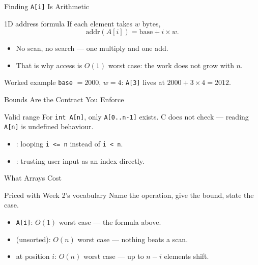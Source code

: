\documentclass[aspectratio=169]{beamer}
\begin{document}
\begin{frame}{Finding \texttt{A[i]} Is Arithmetic}
  \begin{block}{1D address formula}
    If each element takes $w$ bytes,
    \[ \text{addr}(A[i]) = \text{base} + i \times w. \]
  \end{block}
  \begin{itemize}
    \item No scan, no search --- one multiply and one add.
    \item That is why access is $O(1)$ worst case: the work does not grow
      with $n$.
  \end{itemize}
  \begin{exampleblock}{Worked example}
    \texttt{base} $= 2000$, $w = 4$: \texttt{A[3]} lives at
    $2000 + 3 \times 4 = 2012$.
  \end{exampleblock}
\end{frame}

\begin{frame}{Bounds Are the Contract You Enforce}
  \begin{block}{Valid range}
    For \texttt{int A[n]}, only \texttt{A[0..n-1]} exists. C does not check
    --- reading \texttt{A[n]} is undefined behaviour.
  \end{block}
  \begin{itemize}
    \item {}: looping \texttt{i <= n} instead of \texttt{i < n}.
    \item {}: trusting user input as an index directly.
  \end{itemize}
\end{frame}

\begin{frame}{What Arrays Cost}
  \begin{block}{Priced with Week 2's vocabulary}
    Name the operation, give the bound, state the case.
  \end{block}
  \begin{itemize}
    \item {} \texttt{A[i]}: $O(1)$ worst case --- the formula above.
    \item {} (unsorted): $O(n)$ worst case --- nothing beats a scan.
    \item {} at position $i$: $O(n)$ worst case --- up to
      $n - i$ elements shift.
  \end{itemize}
\end{frame}
\end{document}
